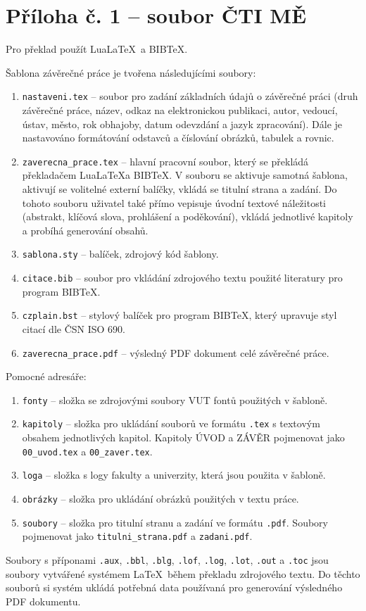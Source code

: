 \chapter{Příloha č. 1 -- soubor ČTI MĚ}
Pro překlad použít Lua\LaTeX\ a BIB\TeX.

Šablona závěrečné práce je tvořena následujícími soubory:

\begin{enumerate}
	\item \verb|nastaveni.tex| -- soubor pro zadání základních údajů o závěrečné práci (druh závěrečné práce, název, odkaz na elektronickou publikaci, autor, vedoucí, ústav, město, rok obhajoby, datum odevzdání a jazyk zpracování). Dále je nastavováno formátování odstavců a číslování obrázků, tabulek a rovnic.
	\item \verb|zaverecna_prace.tex| -- hlavní pracovní soubor, který se překládá překladačem Lua\LaTeX a BIB\TeX. V souboru se aktivuje samotná šablona, aktivují se volitelné externí balíčky, vkládá se titulní strana a zadání. Do tohoto souboru uživatel také přímo vepisuje úvodní textové náležitosti (abstrakt, klíčová slova, prohlášení a poděkování), vkládá jednotlivé kapitoly a probíhá generování obsahů.
	\item \verb|sablona.sty| -- balíček, zdrojový kód šablony.
	\item \verb|citace.bib| -- soubor pro vkládání zdrojového textu použité literatury pro program BIB\TeX.
	\item \verb|czplain.bst| -- stylový balíček pro program BIB\TeX, který upravuje styl citací dle ČSN ISO 690.
	\item \verb|zaverecna_prace.pdf| -- výsledný PDF dokument celé závěrečné práce.	
\end{enumerate}

Pomocné adresáře:

\begin{enumerate}
	\item \verb|fonty| -- složka se zdrojovými soubory VUT fontů použitých v šabloně.
	\item \verb|kapitoly| -- složka pro ukládání souborů ve formátu \verb|.tex| s textovým obsahem jednotlivých kapitol. Kapitoly ÚVOD a ZÁVĚR pojmenovat jako \verb|00_uvod.tex| a \verb|00_zaver.tex|.
	\item \verb|loga| -- složka s logy fakulty a univerzity, která jsou použita v šabloně.
	\item \verb|obrázky| -- složka pro ukládání obrázků použitých v textu práce.
	\item \verb|soubory| -- složka pro titulní stranu a zadání ve formátu \verb|.pdf|. Soubory pojmenovat jako \verb|titulni_strana.pdf| a \verb|zadani.pdf|.
\end{enumerate}

Soubory s příponami \verb|.aux|, \verb|.bbl|, \verb|.blg|, \verb|.lof|, \verb|.log|, \verb|.lot|, \verb|.out| a \verb|.toc| jsou soubory vytvářené systémem \LaTeX\ během překladu zdrojového textu. Do těchto souborů si systém ukládá potřebná data používaná pro generování výsledného PDF dokumentu.